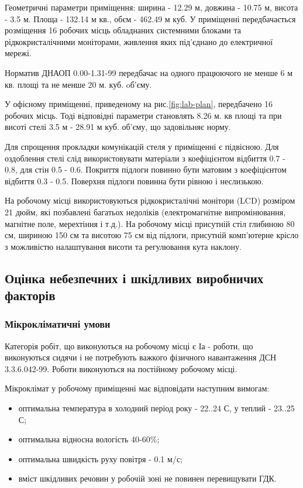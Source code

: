     Геометричні параметри приміщення: ширина - 12.29 м, довжина - 10.75 м, висота - 3.5 м. Площа - 132.14 м кв., обєм - 462.49 м куб.
    У приміщенні передбачається розміщення 16 робочих місць обладнаних системними блоками та рідкокристалічними моніторами, живлення яких під'єднано до електричної мережі.

    Норматив ДНАОП 0.00-1.31-99\cite{lab-dnaop} передбачає на одного працюючого не менше 6 м кв. площі та не менше 20 м. куб. oб'єму.

    У офісному приміщенні, приведеному на рис.\ref{fig:lab-plan}, передбачено 16 робочих місць. Тоді відповідні параметри становлять 8.26 м. кв площі та при висоті стелі 3.5 м -  28.91 м куб. об'єму, що задовільняє норму.

    Для спрощення прокладки комунікацій стеля у приміщенні є підвісною. Для оздоблення стелі слід використовувати матеріали з коефіцієнтом відбиття 0.7 - 0.8, для стін 0.5 - 0.6.
    Покриття підлоги повинно бути матовим з коефіцієнтом відбиття 0.3 - 0.5. Поверхня підлоги повинна бути рівною і неслизькою.

    На робочому місці використовуються рідкокристалічні монітори (LCD) розміром 21 дюйм, які позбавлені багатьох недоліків (електромагнітне випромінювання, магнітне поле, мерехтіння і т.д.). На робочому місці присутній стіл глибиною 80 см, шириною 150 см та висотою 75 см від підлоги, присутній комп'ютерне крісло з можливістю налаштування висоти та регулювання кута наклону.

\subsection{Оцінка небезпечних і шкідливих виробничих факторів}
    \subsubsection{Мікрокліматичні умови}
    Категорія робіт, що виконуються на робочому місці є Іа - роботи, що виконуються сидячи і не потребують важкого фізичного навантаження ДСН 3.3.6.042-99\cite{lab-dsn42}. Роботи виконуються на постійному робочому місці.

    Мікроклімат у робочому приміщенні має відповідати наступним вимогам:
    \begin{itemize}
        \item оптимальна температура в холодний період року - 22..24 С, у теплий - 23..25 С;
        \item оптимальна відносна вологість 40-60\%;
        \item оптимальна швидкість руху повітря - 0.1 м/с;
        \item вміст шкідливих речовин у робочій зоні не повинен перевищувати ГДК.
    \end{itemize}

